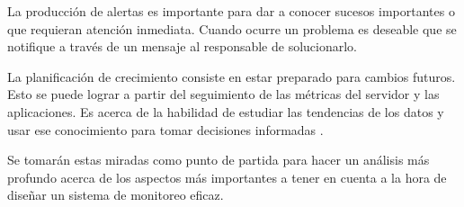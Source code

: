 La producción de alertas es importante para dar a conocer sucesos importantes o
que requieran atención inmediata. Cuando ocurre un problema es deseable que se
notifique a través de un mensaje al responsable de solucionarlo.

La planificación de crecimiento consiste en estar preparado para cambios
futuros. Esto se puede lograr a partir del seguimiento de las métricas del
servidor y las aplicaciones. Es acerca de la habilidad de estudiar las
tendencias de los datos y usar ese conocimiento para tomar decisiones
informadas \cite[p.~15]{monitoreo:monitoring_with_grapfite}.

Se tomarán estas miradas como punto de partida para hacer un análisis más
profundo acerca de los aspectos más importantes a tener en cuenta a la hora de
diseñar un sistema de monitoreo eficaz.
